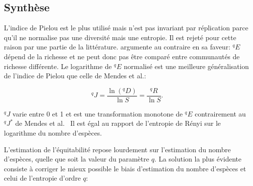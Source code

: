 \documentclass[
  11pt,
  french,
  a4paper,
  extrafontsizes,onecolumn,openright
  ]{memoir}
\newenvironment{Shaded}{\begin{snugshade}}{\end{snugshade}}
\newcommand{\AttributeTok}[1]{\textcolor[rgb]{0.13,0.29,0.53}{#1}}
\newcommand{\CommentTok}[1]{\textcolor[rgb]{0.56,0.35,0.01}{\textit{#1}}}
\newcommand{\DecValTok}[1]{\textcolor[rgb]{0.00,0.00,0.81}{#1}}
\newcommand{\FunctionTok}[1]{\textcolor[rgb]{0.13,0.29,0.53}{\textbf{#1}}}
\newcommand{\NormalTok}[1]{#1}
\newcommand{\OtherTok}[1]{\textcolor[rgb]{0.56,0.35,0.01}{#1}}
\newcommand{\SpecialCharTok}[1]{\textcolor[rgb]{0.81,0.36,0.00}{\textbf{#1}}}
\newcommand{\StringTok}[1]{\textcolor[rgb]{0.31,0.60,0.02}{#1}}
\newlength{\rf}
\begin{document}
\begin{Shaded}
\end{Shaded}

\normalsize

\subsection{Synthèse}\label{synthuxe8se-3}

L'indice de Pielou est le plus utilisé \autocite{Tuomisto2012} mais n'est pas invariant par réplication parce qu'il ne normalise pas une diversité mais une entropie.
Il est rejeté pour cette raison \autocite{Smith1996,Tuomisto2012} par une partie de la littérature.
\textcite{Jost2010} argumente au contraire en sa faveur: \(^{q}\!E\) dépend de la richesse et ne peut donc pas être comparé entre communautés de richesse différente.
Le logarithme de \(^{q}\!E\) normalisé est une meilleure généralisation de l'indice de Pielou que celle de Mendes et al.:

\begin{equation}
  \label{eq:PielouJq}
  ^{q}\!J
  = \frac{\ln\left({^{q}\!D}\right)}{\ln S}
  = \frac{^{q}\!R}{\ln S}.
\end{equation}

\(^{q}\!J\) varie entre 0 et 1 et est une transformation monotone de \(^{q}\!E\) contrairement au \(^{q}\!J^{*}\) de Mendes et al.~
Il est égal au rapport de l'entropie de Rényi sur le logarithme du nombre d'espèces.

L'estimation de l'équitabilité repose lourdement sur l'estimation du nombre d'espèces, quelle que soit la valeur du paramètre \(q\).
La solution la plus évidente consiste à corriger le mieux possible le biais d'estimation du nombre d'espèces et celui de l'entropie d'ordre \(q\):
\end{document}
